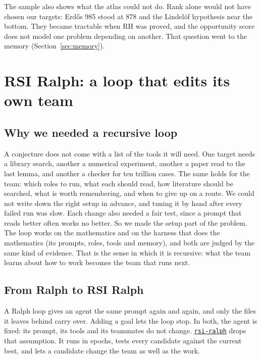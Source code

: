 \documentclass[11pt]{amsart}
\newcommand{\trepo}[1]{\href{https://github.com/tinyhumansai/#1}{\texttt{#1}}}
\begin{document}
The sample also shows what the atlas could not do. Rank alone would not have chosen our targets: Erd\H{o}s 985 stood at 878 and the Lindel\"of hypothesis near the bottom. They became tractable when RH was proved, and the opportunity score does not model one problem depending on another. That question went to the memory (Section~\ref{sec:memory}).

\section{RSI Ralph: a loop that edits its own team}\label{sec:loop}

\subsection*{Why we needed a recursive loop} A conjecture does not come with a list of the tools it will need. One target needs a library search, another a numerical experiment, another a paper read to the last lemma, and another a checker for ten trillion cases. The same holds for the team: which roles to run, what each should read, how literature should be searched, what is worth remembering, and when to give up on a route. We could not write down the right setup in advance, and tuning it by hand after every failed run was slow. Each change also needed a fair test, since a prompt that reads better often works no better. So we made the setup part of the problem. The loop works on the mathematics and on the harness that does the mathematics (its prompts, roles, tools and memory), and both are judged by the same kind of evidence. That is the sense in which it is recursive: what the team learns about how to work becomes the team that runs next.

\subsection*{From Ralph to RSI Ralph} A Ralph loop gives an agent the same prompt again and again, and only the files it leaves behind carry over. Adding a goal lets the loop stop. In both, the agent is fixed: its prompt, its tools and its teammates do not change. \trepo{rsi-ralph} \cite{rsiralph} drops that assumption. It runs in epochs, tests every candidate against the current best, and lets a candidate change the team as well as the work.
\end{document}
